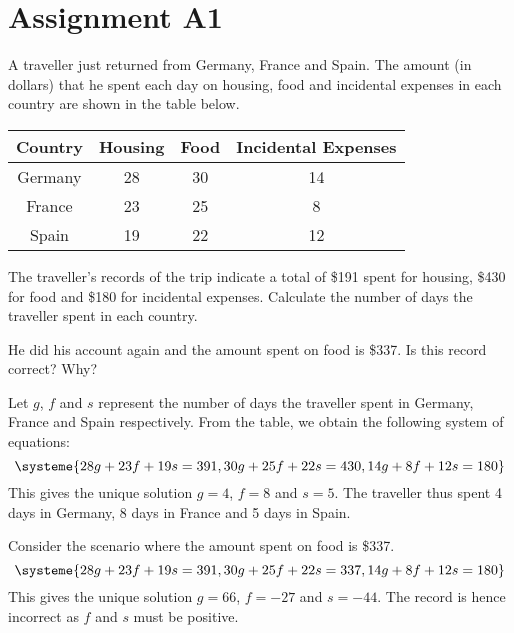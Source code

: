 \clearpage
\section{Assignment A1}

\begin{problem}
    A traveller just returned from Germany, France and Spain. The amount (in dollars) that he spent each day on housing, food and incidental expenses in each country are shown in the table below.
    \begin{table}[H]
        \centering
        \begin{tabular}{|c|c|c|c|}
        \hline
        \textbf{Country} & \textbf{Housing} & \textbf{Food} & \textbf{Incidental Expenses}  \\\hline
        Germany & 28      & 30   & 14                   \\\hline
        France  & 23      & 25   & 8                    \\\hline
        Spain   & 19      & 22   & 12 \\\hline                  
        \end{tabular}
    \end{table}
    The traveller's records of the trip indicate a total of \$191 spent for housing, \$430 for food and \$180 for incidental expenses. Calculate the number of days the traveller spent in each country.

    He did his account again and the amount spent on food is \$337. Is this record correct? Why?
\end{problem}
\begin{solution}
    Let $g$, $f$ and $s$ represent the number of days the traveller spent in Germany, France and Spain respectively. From the table, we obtain the following system of equations: \[\systeme{28g + 23f + 19s = 391,30g + 25f + 22s = 430,14g + 8f + 12s = 180}\] This gives the unique solution $g=4$, $f=8$ and $s=5$. The traveller thus spent 4 days in Germany, 8 days in France and 5 days in Spain. 

    Consider the scenario where the amount spent on food is \$337. \[\systeme{28g + 23f + 19s = 391,30g + 25f + 22s = 337,14g + 8f + 12s = 180}\] This gives the unique solution $g=66$, $f=-27$ and $s=-44$. The record is hence incorrect as $f$ and $s$ must be positive.
\end{solution}

